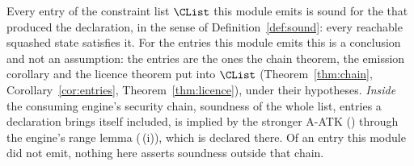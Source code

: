 
\begin{remark}\label{rem:sound-and-atk}
Every entry of the constraint list $\CList$ this module emits is sound for
the  that produced the declaration, in the sense of
Definition~\ref{def:sound}: every reachable squashed state satisfies it. For
the entries this module emits this is a conclusion and not an assumption:
the entries are the ones the chain theorem, the emission corollary and the
licence theorem put into $\CList$ (Theorem~\ref{thm:chain},
Corollary~\ref{cor:entries}, Theorem~\ref{thm:licence}), under their
hypotheses. \emph{Inside} the consuming engine's security chain, soundness of
the whole list, entries a declaration brings itself included, is implied by
the stronger A-ATK () through the engine's
range lemma (\,(i)), which is declared there.
Of an entry this module did not emit, nothing here asserts soundness outside
that chain.
\end{remark}

